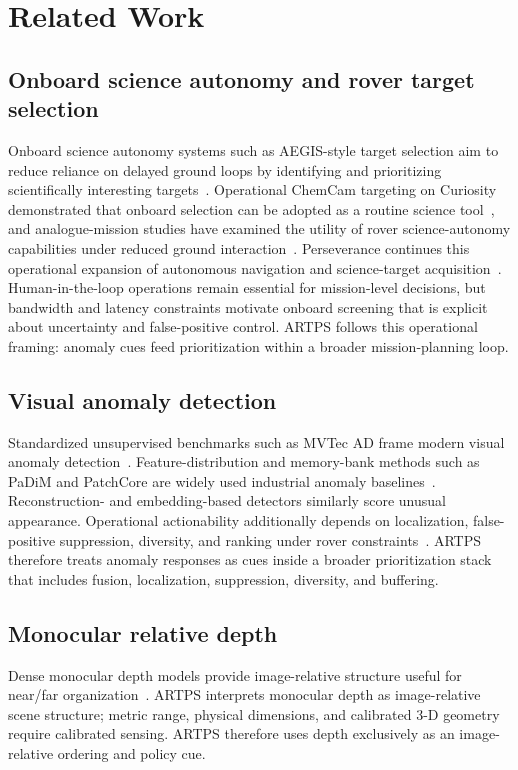 \section{Related Work}

\subsection{Onboard science autonomy and rover target selection}
Onboard science autonomy systems such as AEGIS-style target selection aim to reduce reliance
on delayed ground loops by identifying and prioritizing scientifically interesting
targets~\citep{estlin2012,francis2017aegis}.
Operational ChemCam targeting on Curiosity demonstrated that onboard selection can be adopted
as a routine science tool~\citep{francis2017aegis}, and analogue-mission studies have examined
the utility of rover science-autonomy capabilities under reduced ground interaction~\citep{francis2019utility}.
Perseverance continues this operational expansion of autonomous navigation and science-target
acquisition~\citep{verma2023perseverance}.
Human-in-the-loop operations remain essential for mission-level decisions, but bandwidth and
latency constraints motivate onboard screening that is explicit about uncertainty and
false-positive control.
ARTPS follows this operational framing: anomaly cues feed prioritization within a broader
mission-planning loop.

\subsection{Visual anomaly detection}
Standardized unsupervised benchmarks such as {MVTec} {AD} frame modern visual anomaly
detection~\citep{bergmann2019mvtec}.
Feature-distribution and memory-bank methods such as PaDiM and PatchCore are widely used
industrial anomaly baselines~\citep{defard2020padim,roth2022patchcore}.
Reconstruction- and embedding-based detectors similarly score unusual appearance.
Operational actionability additionally depends on localization, false-positive suppression,
diversity, and ranking under rover constraints~\citep{gaines2020srr}.
ARTPS therefore treats anomaly responses as cues inside a broader prioritization stack that
includes fusion, localization, suppression, diversity, and buffering.

\subsection{Monocular relative depth}
Dense monocular depth models provide image-relative structure useful for near/far
organization~\citep{ranftl2021dpt,ranftl2022robust}.
ARTPS interprets monocular depth as image-relative scene structure; metric range, physical
dimensions, and calibrated 3-D geometry require calibrated sensing.
ARTPS therefore uses depth exclusively as an image-relative ordering and policy cue.

